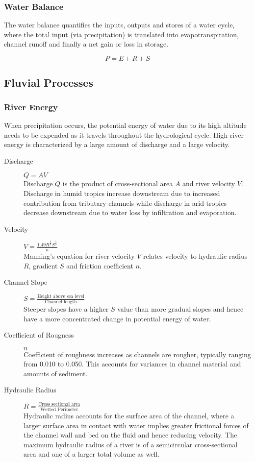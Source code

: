 \documentclass[../../main]{subfiles}
\begin{document}
\subsubsection{Water Balance}

	The water balance quantifies the inputs, outputs and stores of a water cycle, where the total input (via precipitation) is translated into evapotranspiration, channel runoff and finally a net gain or loss in storage.

	\[P = E + R \pm S\]

\subsection{Fluvial Processes}

\subsubsection{River Energy}

	When precipitation occurs, the potential energy of water due to its high altitude needs to be expended as it travels throughout the hydrological cycle. High river energy is characterized by a large amount of discharge and a large velocity.

	\begin{description}
		\item[Discharge] \(Q = AV\) \\
			Discharge \(Q\) is the product of cross-sectional area \(A\) and river velocity \(V\). Discharge in humid tropics increase downstream due to increased contribution from tributary channels while discharge in arid tropics decrease downstream due to water loss by infiltration and evaporation. 
		\item[Velocity] \(V = \frac{1.49 R^{\frac{2}{3}} S^{\frac{1}{2}}}{n}\) \\
			Manning's equation for river velocity \(V\) relates velocity to hydraulic radius \(R\), gradient \(S\) and friction coefficient \(n\).
		\item[Channel Slope] \(S = \frac{\text{Height above sea level}}{\text{Channel length}}\) \\
			Steeper slopes have a higher \(S\) value than more gradual slopes and hence have a more concentrated change in potential energy of water. 
		\item[Coefficient of Rougness] \(n\) \\
			Coefficient of roughness increases as channels are rougher, typically ranging from 0.010 to 0.050. This accounts for variances in channel material and amounts of sediment.
		\item[Hydraulic Radius] \(R = \frac{\text{Cross sectional area}}{\text{Wetted Perimeter}}\) \\
			Hydraulic radius accounts for the surface area of the channel, where a larger surface area in contact with water implies greater frictional forces of the channel wall and bed on the fluid and hence reducing velocity. The maximum hydraulic radius of a river is of a semicircular cross-sectional area and one of a larger total volume as well.
	\end{description}
\end{document}
